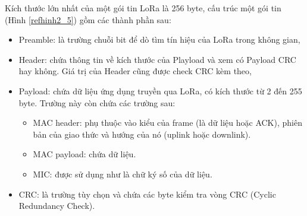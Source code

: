 \par
Kích thước lớn nhất của một gói tin LoRa là 256 byte, cấu trúc một gói tin (Hình \ref{refhinh2_5}{}) gồm các thành phần sau:
\begin{itemize}
\item  Preamble: là trường chuỗi bit để dò tìm tín hiệu của LoRa trong không gian,\newline
\item  Header: chứa thông tin về kích thước của Playload và xem có Payload CRC hay không. Giá trị của Header cũng được check CRC kèm theo,
\item  Payload: chứa dữ liệu ứng dụng truyền qua LoRa, có kích thước từ 2 đến 255 byte. Trường này còn chứa các trường sau:
	\begin{itemize}
	\item	MAC header: phụ thuộc vào kiểu của frame (là dữ liệu hoặc ACK), phiên bản của giao thức và hướng của nó (uplink hoặc downlink).
	\item	MAC payload: chứa dữ liệu.
	\item 	MIC: được sử dụng như là chữ ký số của dữ liệu.
	\end{itemize}
\item	CRC: là trường tùy chọn và chứa các byte kiểm tra vòng CRC (Cyclic Redundancy Check).
\end{itemize}
